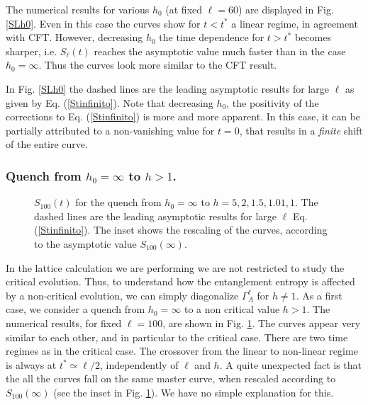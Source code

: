 The numerical results for various $h_0$ (at fixed $\ell=60$) are displayed 
in Fig. \ref{SLh0}.
Even in this case the curves show for $t<t^*$ a linear regime, in 
agreement with CFT.
However, decreasing $h_0$ the time dependence for $t>t^*$ becomes sharper, 
i.e. $S_\ell(t)$ reaches the asymptotic value much faster than 
in the case $h_0=\infty$.
Thus the curves look more similar to the CFT result.

In Fig. \ref{SLh0} the dashed lines are the leading asymptotic results for 
large $\ell$ as given by Eq. (\ref{Stinfinito}).
Note that decreasing $h_0$, the positivity of the corrections to 
Eq. (\ref{Stinfinito}) is more and more apparent. 
In this case, it can be partially attributed to a non-vanishing value for 
$t=0$, that results in a {\em finite} shift of the entire curve.




\subsubsection{Quench from $h_0=\infty$ to $h>1$.}

\begin{figure}[t]
\centerline{}
\caption{$S_{100}(t)$ for the quench from $h_0=\infty$ to $h=5,2,1.5,1.01,1$.
The dashed lines are the leading asymptotic results for large $\ell$ 
Eq. (\ref{Stinfinito}).
The inset shows the rescaling of the curves, according to the asymptotic 
value $S_{100}(\infty)$.}
\label{SLh}
\end{figure}

In the lattice calculation we are performing we are not restricted to
study the critical evolution. Thus, to understand how the entanglement 
entropy is affected by a non-critical evolution, we can simply diagonalize
$\Gamma_A^\ell$ for $h\neq1$.
As a first case, we consider a quench from $h_0=\infty$ to a 
non critical value $h>1$.
The numerical results, for fixed $\ell=100$, are shown in Fig. \ref{SLh}. 
The curves appear very similar to each other, and in particular to the 
critical case. There are two time regimes as in the critical case.
The crossover from the linear to non-linear regime is always at 
$t^*\simeq \ell/2$, independently of $\ell$ and $h$.  
A quite unexpected fact is that the all the curves fall 
on the same master curve, when rescaled according to $S_{100}(\infty)$
(see the inset in Fig. \ref{SLh}). 
We have no simple explanation for this.




